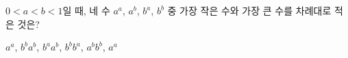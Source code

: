 $0<a<b<1$일 때, 네 수 $a^a$, $a^b$, $b^a$, $b^b$ 중 가장 작은 수와 가장 큰 수를 차례대로 적은 것은?
\begin{choices32}{$a^a$, $b^b$}{$a^b$, $b^a$}{$a^b$, $b^b$}{$b^a$, $a^b$}{$b^b$, $a^a$}\end{choices32}
